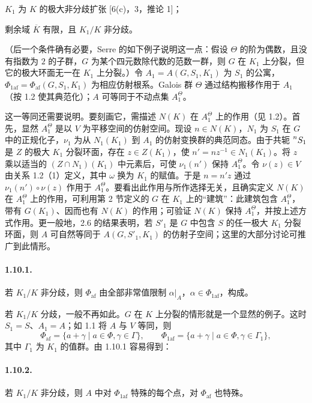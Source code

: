 $K_1$ 为 $K$ 的极大非分歧扩张 [6(c)，3，推论 1]；

剩余域 $\overline K$ 有限，且 $K_1/K$ 非分歧。

（后一个条件确有必要，Serre 的如下例子说明这一点：假设 $\Theta$ 的阶为偶数，且没有指数为 $2$ 的子群，$G$ 为某个四元数除代数的范数一群，则 $G$ 在 $K_1$ 上分裂，但它的极大环面无一在 $K_1$ 上分裂。）令 $A_1=A(G,S_1,K_1)$ 为 $S_1$ 的公寓，$\Phi_{1\mathrm{af}}=\Phi_{\mathrm{af}}(G,S_1,K_1)$ 为相应仿射根系。Galois 群 $\Theta$ 通过结构搬移作用于 $A_1$（按 1.2 使其典范化）；$A$ 可等同于不动点集 $A_1^\Theta$。

这一等同还需要说明。要刻画它，需描述 $N(K)$ 在 $A_1^\Theta$ 上的作用（见 1.2）。首先，显然 $A_1^\Theta$ 是以 $V$ 为平移空间的仿射空间。现设 $n\in N(K)$，$N_1$ 为 $S_1$ 在 $G$ 中的正规化子，$\nu_1$ 为从 $N_1(K_1)$ 到 $A_1$ 的仿射变换群的典范同态。由于共轭 $\prescript{n}{}{S_1}$ 是 $Z$ 的极大 $K_1$ 分裂环面，存在 $z\in Z(K_1)$，使 $n'=nz^{-1}\in N_1(K_1)$。将 $z$ 乘以适当的 $(Z\cap N_1)(K_1)$ 中元素后，可使 $\nu_1(n')$ 保持 $A_1^\Theta$。令 $\nu(z)\in V$ 由关系 1.2（1）定义，其中 $\omega$ 换为 $K_1$ 的赋值。于是 $n=n'z$ 通过 $\nu_1(n')\circ\nu(z)$ 作用于 $A_1^\Theta$。要看出此作用与所作选择无关，且确实定义 $N(K)$ 在 $A_1^\Theta$ 上的作用，可利用第 2 节定义的 $G$ 在 $K_1$ 上的“建筑”：此建筑包含 $A_1^\Theta$，带有 $G(K_1)$、因而也有 $N(K)$ 的作用；可验证 $N(K)$ 保持 $A_1^\Theta$，并按上述方式作用。更一般地，2.6 的结果表明，若 $S'_1$ 是 $G$ 中包含 $S$ 的任一极大 $K_1$ 分裂环面，则 $A$ 可自然等同于 $A(G,S'_1,K_1)$ 的仿射子空间；这里的大部分讨论可推广到此情形。

\paragraph*{1.10.1.}若 $K_1/K$ 非分歧，则 $\Phi_{\mathrm{af}}$ 由全部非常值限制 $\alpha|_A$，$\alpha\in\Phi_{1\mathrm{af}}$，构成。

若 $K_1/K$ 分歧，一般不再如此。$G$ 在 $K$ 上分裂的情形就是一个显然的例子。这时 $S_1=S$、$A_1=A$；如 1.1 将 $A$ 与 $V$ 等同，则
\[
\Phi_{\mathrm{af}}=\{a+\gamma\mid a\in\Phi,\gamma\in\Gamma\},\qquad
\Phi_{1\mathrm{af}}=\{a+\gamma\mid a\in\Phi,\gamma\in\Gamma_1\},
\]
其中 $\Gamma_1$ 为 $K_1$ 的值群。由 1.10.1 容易得到：

\paragraph*{1.10.2.}若 $K_1/K$ 非分歧，则 $A$ 中对 $\Phi_{1\mathrm{af}}$ 特殊的每个点，对 $\Phi_{\mathrm{af}}$ 也特殊。

